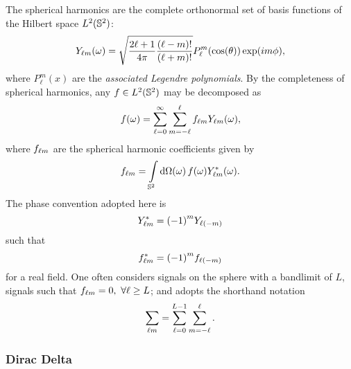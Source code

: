The spherical harmonics are the complete orthonormal set of basis functions of the Hilbert space \(L^{2}(\mathbb{S}^{2})\):
%
\begin{equation}\label{eq:chapter3_spherical_harmonic}
	{Y}_{\ell m}(\omega)
	= \sqrt{\frac{2\ell+1}{4\pi} \frac{(\ell-m)!}{(\ell+m)!}} P^{m}_{\ell}(\cos(\theta)) \exp(i m\phi),
\end{equation}
%
where \(P^{m}_{\ell}(x)\) are the \emph{associated Legendre polynomials}.
By the completeness of spherical harmonics, any \(f \in L^{2}(\mathbb{S}^{2})\) may be decomposed as
%
\begin{equation}
	f(\omega)
	= \sum\limits_{\ell=0}^{\infty} \sum\limits_{m=-\ell}^{\ell} {f}_{\ell m} {Y}_{\ell m}(\omega),
\end{equation}
%
where \({f}_{\ell m}\) are the spherical harmonic coefficients given by
%
\begin{equation}
	{f}_{\ell m}
	= \int\limits_{\mathbb{S}^{2}} \dd{\Omega(\omega)} f(\omega) {Y}_{\ell m}^{\ast}(\omega).
\end{equation}
%
The phase convention adopted here is
%
\begin{equation}\label{eq:chapter3_spherical_harmonic_phase}
	{Y}_{\ell m}^{\ast}
	= {(-1)}^{m} Y_{\ell(-m)}
\end{equation}
%
such that
%
\begin{equation}\label{eq:chapter3_f_phase}
	{f}_{\ell m}^{\ast}
	= {(-1)}^{m} f_{\ell(-m)}
\end{equation}
%
for a real field.
One often considers signals on the sphere with a bandlimit of \(L\), \ie{} signals such that \({f}_{\ell m} = 0,\ \forall \ell \geq L\); and adopts the shorthand notation
%
\begin{equation}
	\sum\limits_{\ell m}
	= \sum\limits_{\ell=0}^{L-1} \sum\limits_{m=-\ell}^{\ell}.
\end{equation}

\subsubsection{Dirac Delta}

